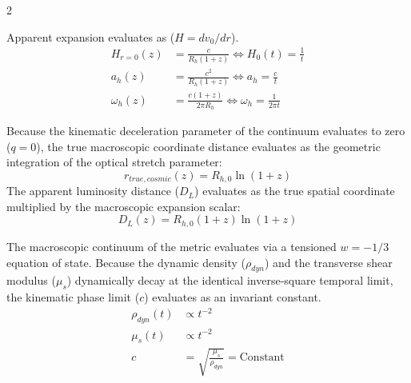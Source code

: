 \begin{multicols}{2}
\begin{tcolorbox}[cheatbox, title={\refstepcounter{cheatnum}\label{box:kinematic_gradients}\thecheatnum. Kinematic Gradients \hfill\makebox[0pt][r]{\scriptsize\hyperref[sec:deriv_kinematic_gradients]{[Proof $\downarrow$]}}}]
Apparent expansion evaluates as ($H = dv_0/dr$). 
\begin{align}
    H_{r=0}(z) &= \frac{c}{R_{h}(1+z)} \iff H_{0}(t) = \frac{1}{t} \label{eq:happ} \\
    a_{h}(z) &= \frac{c^2}{R_{h}(1+z)} \iff a_{h} = \frac{c}{t} \label{eq:aapp} \\
    \omega_{h}(z) &= \frac{c(1+z)}{2\pi R_{h}} \iff \omega_h = \frac{1}{2\pi t} \label{eq:phase_frequency}
\end{align}
\end{tcolorbox}

\begin{tcolorbox}[cheatbox, title={\refstepcounter{cheatnum}\label{box:optical_dilatation}\thecheatnum. Optical Dilatation \hfill\makebox[0pt][r]{\scriptsize\hyperref[sec:deriv_optical_dilatation]{[Proof $\downarrow$]}}}]
Because the kinematic deceleration parameter of the continuum evaluates to zero ($q=0$), the true macroscopic coordinate distance evaluates as the geometric integration of the optical stretch parameter:
\begin{equation}\label{eq:r_cosmic}
    r_{true, cosmic}(z) = R_{h,0} \ln(1+z)
\end{equation}
The apparent luminosity distance ($D_L$) evaluates as the true spatial coordinate multiplied by the macroscopic expansion scalar:
\begin{equation}\label{eq:dl}
    D_L(z) = R_{h,0} (1+z) \ln(1+z)
\end{equation}
\end{tcolorbox}

\begin{tcolorbox}[cheatbox, title={\refstepcounter{cheatnum}\label{box:acoustic_invariance}\thecheatnum. Cosmic Expansion \& Acoustic Invariance \\ \null\hfill\scriptsize\hyperref[sec:deriv_acoustic_invariance]{[Proof $\downarrow$]}}]
The macroscopic continuum of the metric evaluates via a tensioned $w = -1/3$ equation of state. Because the dynamic density ($\rho_{dyn}$) and the transverse shear modulus ($\mu_s$) dynamically decay at the identical inverse-square temporal limit, the kinematic phase limit ($c$) evaluates as an invariant constant. %
\begin{align}
    \rho_{dyn}(t) &\propto t^{-2} \label{eq:density_decay} \\
    \mu_s(t) &\propto t^{-2} \label{eq:stiffness_decay} \\
    c &= \sqrt{\frac{\mu_s}{\rho_{dyn}}} = \text{Constant}  \label{eq:c_invariant} 
\end{align}
\end{tcolorbox}


\end{multicols}
